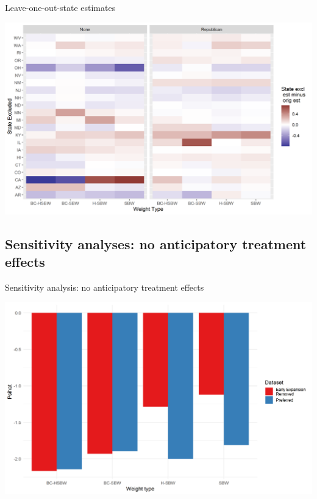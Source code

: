 \documentclass[hyperref={pdfpagelabels=false}]{beamer}
\begin{document}
\begin{frame}{Leave-one-out-state estimates}
    \begin{center}
	\includegraphics[scale=0.5]{01_Plots/c1-loostate-sensitivity.png}
    \end{center}
\end{frame}

\subsection{Sensitivity analyses: no anticipatory treatment effects}

\begin{frame}{Sensitivity analysis: no anticipatory treatment effects}
    \begin{center}
	\includegraphics[scale=0.5]{01_Plots/point-estimates-sigmai-c1c2-comparison.png}
    \end{center}
\end{frame}
\end{document}
